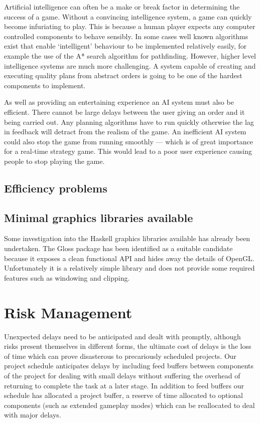 Artificial intelligence can often be a make or break factor in determining the success of
a game. Without a convincing intelligence system, a game can
quickly become infuriating to play. This is because a human player expects any computer
controlled components to behave sensibly. In some cases well known algorithms exist that
enable `intelligent' behaviour to be implemented relatively easily, for example the use
of the A* search algorithm for pathfinding. However, higher level intelligence systems
are much more challenging. A system capable of creating and executing quality plans
from abstract orders is going to be one of the hardest components to implement.

As well as providing an entertaining experience an AI system must also be efficient.
There cannot be large delays between the user giving an order and it being carried
out. Any planning algorithms have to run quickly otherwise the lag in feedback will
detract from the realism of the game. An inefficient AI system could also stop the game
from running smoothly --- which is of great importance for a real-time strategy game.
This would lead to a poor user experience causing people to stop playing the game.

\subsection{Efficiency problems}

\subsection{Minimal graphics libraries available}

Some investigation into the Haskell graphics libraries available has already been undertaken.
The Gloss package has been identified as a suitable candidate because it exposes a clean
functional API and hides away the details of OpenGL. Unfortunately it is a relatively simple
library and does not provide some required features such as windowing and clipping.

\section{Risk Management}

Unexpected delays need to be anticipated and dealt with promptly, although risks present themselves in different forms, the ultimate cost of delays is the loss of time which can prove disasterous to precariously scheduled projects. Our project schedule anticipates delays by including feed buffers between components of the project for dealing with small delays without suffering the overhead of returning to complete the task at a later stage. In addition to feed buffers our schedule has allocated a project buffer, a reserve of time allocated to optional components (such as extended gameplay modes) which can be reallocated to deal with major delays.
